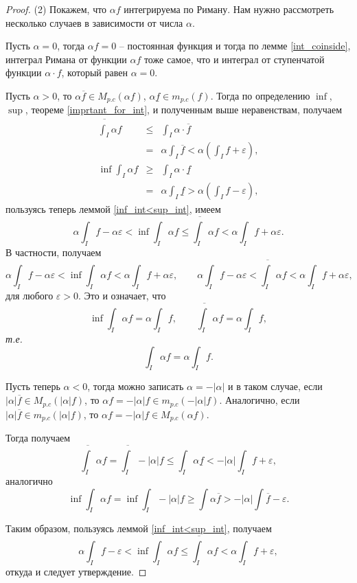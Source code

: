 \begin{proof}
(2) Покажем, что $\alpha f$ интегрируема по Риману. Нам нужно рассмотреть несколько случаев в зависимости от числа $\alpha.$

Пусть $\alpha = 0$, тогда $\alpha f=0$ -- постоянная функция и тогда по лемме \ref{int_coinside}, интеграл Римана от функции $\alpha f$ тоже самое, что и интеграл от ступенчатой функции $\alpha \cdot f$, который равен $\alpha = 0.$

Пусть $\alpha >0$, то $\alpha \overline{f} \in M_{p.c}(\alpha f)$, $\alpha \underline{f} \in m_{p.c}(f)$. Тогда
по определению $\inf$, $\sup$, теореме \ref{imprtant_for_int}, и полученным выше неравенствам, получаем
\begin{eqnarray*}
    \overline{\int_I} \alpha f &\le & \int_I \alpha \cdot \overline{f} \\
    &=& \alpha \int_I \overline{f} < \alpha\left( \int_If + \varepsilon \right),\\
    \inf \int_I \alpha f &\ge & \int_I \alpha \cdot \underline{f} \\
    &=& \alpha \int_I \underline{f} > \alpha\left( \int_If - \varepsilon \right),
\end{eqnarray*}
пользуясь теперь леммой \ref{inf_int<sup_int}, имеем
\[
 \alpha \int_I f - \alpha \varepsilon  < \inf \int_I \alpha f \le \overline{\int_I} \alpha f < \alpha \int_I f + \alpha \varepsilon.
\]
В частности, получаем
\[
 \alpha \int_I f - \alpha \varepsilon  < \inf \int_I \alpha f < \alpha \int_I f + \alpha \varepsilon,\qquad \alpha \int_I f - \alpha \varepsilon  <  \overline{\int_I} \alpha f < \alpha \int_I f + \alpha \varepsilon,
\]
для любого $\varepsilon >0.$ Это и означает, что
\[
 \inf \int_I \alpha f = \alpha \int_I f, \qquad \overline{\int_I} \alpha f = \alpha \int_I f,
\]
\textit{т.е.}
\[
 \int_I \alpha f = \alpha \int_I f.
\]

Пусть теперь $\alpha <0$, тогда можно записать $\alpha = - |\alpha|$ и в таком случае, если $|\alpha|\overline{f} \in M_{p.c}(|\alpha| f)$, то $\alpha f = - |\alpha| f \in m_{p.c}(-|\alpha| f)$. Аналогично, если $|\alpha| \overline{f} \in m_{p.c}(|\alpha| f)$, то $\alpha f = - |\alpha|f \in M_{p.c}(\alpha f)$.

Тогда получаем
\[
 \overline{\int_I} \alpha f = \overline{\int_I} -|\alpha|f \le \int_I \alpha \underline{f}  <- |\alpha| \int_I f + \varepsilon,
\]
аналогично
\[
 \inf \int_I \alpha f = \inf \int_I - |\alpha| f \ge \int \alpha \overline{f} > - |\alpha| \int \overline{f} - \varepsilon.
\]

Таким образом, пользуясь леммой \ref{inf_int<sup_int}, получаем
\[
 \alpha \int_I f -\varepsilon < \inf \int_I \alpha f \le \overline{\int_I} \alpha f < \alpha \int_I f + \varepsilon,
\]
откуда и следует утверждение.


\end{proof}
